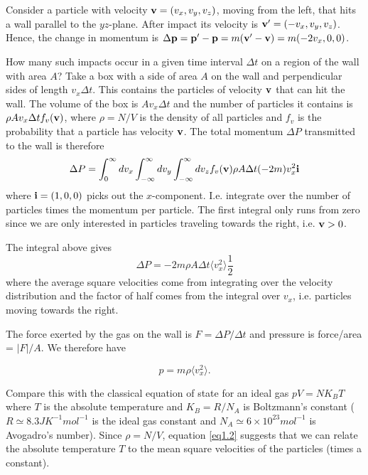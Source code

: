 Consider a particle with velocity ${\bf v} = (v_x,v_y,v_z)$, moving from the left, that hits a wall parallel to the $yz$-plane. After impact its velocity is ${\bf v'}=(-v_x,v_y,v_z)$. Hence, the change in momentum is $\Delta {\bf p}= {\bf p'} - {\bf p} = m({\bf v'}-{\bf v}) = m(-2v_x,0,0)$.

How many such impacts occur in a given time interval $\Delta t$ on a region of the wall with area $A$? 
Take a box with a side of area $A$ on the wall and perpendicular sides of length $v_x\Delta t$. This contains the particles of velocity ${\bf v}$ that can hit the wall. The volume of the box is $Av_x\Delta t$ and the number of particles it contains is $\rho Av_x\Delta t f_v({\bf v})$, where $\rho=N/V$ is the density of all particles  and $f_v$ is the probability that a particle has velocity $\bf v$.
The total momentum $\Delta P$ transmitted to the wall is therefore
$$\Delta P =\int_0^\infty dv_x \int_{-\infty}^\infty dv_y \int_{-\infty}^\infty dv_z f_v({\bf v})\rho A\Delta t(-2m)v_x^2{\bf i}$$
where ${\bf i} =(1,0,0)$ picks out the $x$-component. I.e. integrate over the number of particles times the momentum per particle. The first integral only runs from zero since we are only interested in particles traveling towards the right, i.e. ${\bf v}>0$.

The integral above gives 
$$\Delta P = -2m\rho A\Delta t \langle v_x^2\rangle\frac12$$ where the average square velocities come from integrating over the velocity distribution and the factor of half comes from the integral over $v_x$, i.e. particles moving towards the right.

The force exerted by the gas on the wall is $F=\Delta P/\Delta t$ and pressure is force/area = $|F|/A$.
We therefore have 

\begin{equation}
	p=m\rho  \langle v_x^2\rangle.
	\label{eq1.2}
\end{equation}
 
Compare this with the classical equation of state for an ideal gas $pV=NK_BT$ where $T$ is the absolute temperature and $K_B=R/N_A$ is Boltzmann's constant ($R\simeq8.3JK^{-1}mol^{-1}$ is the ideal gas constant and $N_A\simeq6\times10^{23}mol^{-1}$ is Avogadro's number). Since $\rho = N/V$, equation \ref{eq1.2} suggests that we can relate the absolute temperature $T$ to the mean square velocities of the particles (times a constant).



